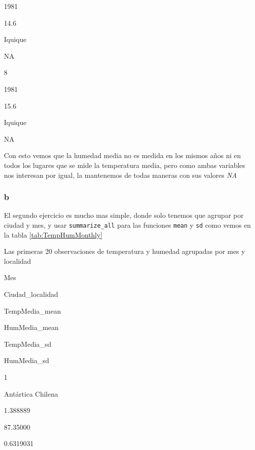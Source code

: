 \documentclass[]{book}
\newenvironment{Shaded}{\begin{snugshade}}{\end{snugshade}}
\newcommand{\DataTypeTok}[1]{\textcolor[rgb]{0.13,0.29,0.53}{#1}}
\newcommand{\KeywordTok}[1]{\textcolor[rgb]{0.13,0.29,0.53}{\textbf{#1}}}
\newcommand{\NormalTok}[1]{#1}
\newcommand{\OperatorTok}[1]{\textcolor[rgb]{0.81,0.36,0.00}{\textbf{#1}}}
\newcommand{\OtherTok}[1]{\textcolor[rgb]{0.56,0.35,0.01}{#1}}
\newcommand{\StringTok}[1]{\textcolor[rgb]{0.31,0.60,0.02}{#1}}
\begin{document}
1981

14.6

Iquique

NA

8

1981

15.6

Iquique

NA

Con esto vemos que la humedad media no es medida en los mismos años ni
en todos los lugares que se mide la temperatura media, pero como ambas
variables nos interesan por igual, la mantenemos de todas maneras con
sus valores \emph{NA}

\hypertarget{b-1}{%
\subsubsection{b}\label{b-1}}

El segundo ejercicio es mucho mas simple, donde solo tenemos que agrupar
por ciudad y mes, y usar \texttt{summarize\_all} para las funciones
\texttt{mean} y \texttt{sd} como vemos en la tabla
\ref{tab:TempHumMonthly}

\begin{Shaded}
\end{Shaded}

\label{tab:TempHumMonthly}Las primeras 20 observaciones de temperatura y
humedad agrupadas por mes y localidad

Mes

Ciudad\_localidad

TempMedia\_mean

HumMedia\_mean

TempMedia\_sd

HumMedia\_sd

1

Antártica Chilena

1.388889

87.35000

0.6319031
\end{document}
